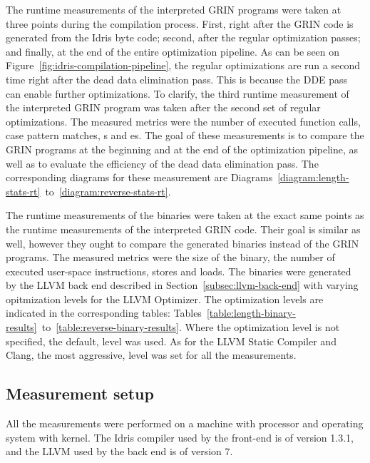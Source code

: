 \documentclass[main.tex]{subfiles}
\begin{document}
	The runtime measurements of the interpreted GRIN programs were taken at three points during the compilation process. First, right after the GRIN code is generated from the Idris byte code; second, after the regular optimization passes; and finally, at the end of the entire optimization pipeline. As can be seen on Figure~\ref{fig:idris-compilation-pipeline}, the regular optimizations are run a second time right after the dead data elimination pass. This is because the DDE pass can enable further optimizations. To clarify, the third runtime measurement of the interpreted GRIN program was taken after the second set of regular optimizations. The measured metrics were the number of executed function calls, case pattern matches, s and es. The goal of these measurements is to compare the GRIN programs at the beginning and at the end of the optimization pipeline, as well as to evaluate the efficiency of the dead data elimination pass. The corresponding diagrams for these measurement are Diagrams~\ref{diagram:length-stats-rt}~to~\ref{diagram:reverse-stats-rt}.

	The runtime measurements of the binaries were taken at the exact same points as the runtime measurements of the interpreted GRIN code. Their goal is similar as well, however they ought to compare the generated binaries instead of the GRIN programs. The measured metrics were the size of the binary, the number of executed user-space instructions, stores and loads. The binaries were generated by the LLVM back end described in Section~\ref{subsec:llvm-back-end} with varying opitmization levels for the LLVM Optimizer. The optimization levels are indicated in the corresponding tables: Tables~\ref{table:length-binary-results}~to~\ref{table:reverse-binary-results}. Where the optimization level is not specified, the default,  level was used. As for the LLVM Static Compiler and Clang, the most aggressive,  level was set for all the measurements.
	
	\subsection{Measurement setup}
	
	All the measurements were performed on a machine with  processor and  operating system with  kernel. The Idris compiler used by the front-end is of version 1.3.1, and the LLVM used by the back end is of version 7.
	
\end{document}
